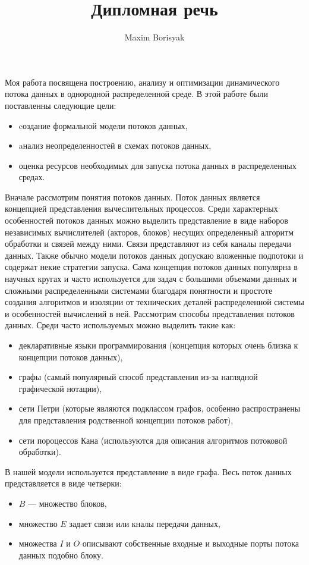 \documentclass[10pt,a4paper,onecolumn]{report}
\author{Maxim Borisyak}
\title{Дипломная речь}
\begin{document}
  Моя работа посвящена построению, анализу и оптимизации динамического потока данных в однородной распределенной среде.
  В этой работе были поставленны следующие цели:
  \begin{itemize}
    \item cоздание формальной модели потоков данных,
    \item aнализ неопределенностей в схемах потоков данных,
    \item оценка ресурсов необходимых для запуска потока данных в распределенных средах.
  \end{itemize}
  
  Вначале рассмотрим понятия потоков данных.
  Поток данных является концепцией представления вычеслительных процессов.
  Среди характерных особенностей потоков данных можно выделить представление в виде наборов независимых вычислителей (акторов, блоков)
  несущих определенный алгоритм обработки и связей между ними. Связи представляют из себя каналы передачи данных. Также обычно модели потоков данных
  допускаю вложенные подпотоки и содержат некие стратегии запуска.
  Сама концепция потоков данных популярна в научных кругах и часто используется для задач с большими объемами данных и сложными распределенными системами
  благодаря понятности и простоте создания алгоритмов и изоляции от технических деталей распределенной системы и особенностей вычислений в ней.
  Рассмотрим способы представления потоков данных. Среди часто используемых можно выделить такие как:
  \begin{itemize}
    \item декларативные языки программирования (концепция которых очень близка к концепции потоков данных),
    \item графы (самый популярный способ представления из-за наглядной графической нотации),
    \item сети Петри (которые являются подклассом графов, особенно распространены для представления родственной концепции потоков работ),
    \item сети пороцессов Кана (используются для описания алгоритмов потоковой обработки).
  \end{itemize}
  
  В нашей модели используется представление в виде графа. Весь поток данных представляется в виде четверки:
  \begin{itemize}
    \item $B$ --- множество блоков,
    \item множество $E$ задает связи или кналы передачи данных,
    \item множества $I$ и $O$ описывают собственные входные и выходные порты потока данных подобно блоку.
  \end{itemize}
  
\end{document}
